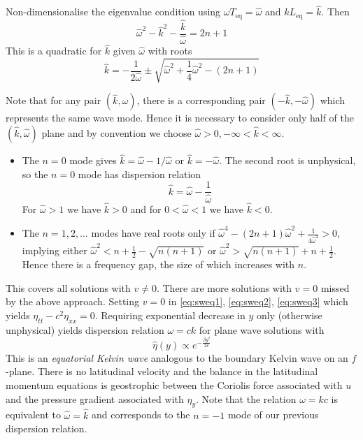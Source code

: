 \documentclass{jknotes}
\begin{document}
Non-dimensionalise the eigenvalue condition using $\omega T_{\text{eq}} =
\hat{\omega}$ and $k L_{\text{eq}} = \hat{k}$. Then
\begin{equation}
	\hat{\omega}^2 - \hat{k}^2 - \frac{\hat{k}}{\hat{\omega}} = 2n+1
\end{equation}
This is a quadratic for $\hat{k}$ given $\hat{\omega}$ with roots
\begin{equation}
	\hat{k} = -\frac{1}{2\hat{\omega}} \pm \sqrt{\hat{\omega}^2 +
	\frac{1}{4}\hat{\omega}^2 - (2n+1)}
\end{equation}

Note that for any pair $(\hat{k}, \hat{\omega})$, there is a corresponding
pair $(-\hat{k},-\hat{\omega})$ which represents the same wave mode. Hence it
is necessary to consider only half of the $(\hat{k}, \hat{\omega})$ plane and
by convention we choose $\hat{\omega} > 0, -\infty < \hat{k} < \infty$. 

\begin{itemize}
	\item The $n=0$ mode gives $\hat{k} = \hat{\omega} - 1/\hat{\omega}$ or
		$\hat{k} = -\hat{\omega}$. The second root is unphysical, so the $n=0$
		mode has dispersion relation
		\begin{equation}
			\hat{k} = \hat{\omega} - \frac{1}{\hat{\omega}}
		\end{equation}
		For $\hat{\omega} > 1$ we have $\hat{k} > 0$ and for $0 < \hat{\omega}
		< 1$ we have $\hat{k} < 0$.
	\item The $n = 1, 2, \dots$ modes have real roots only if $\hat{\omega}^4
		- (2n+1)\hat{\omega}^2 + \frac{1}{4\hat{\omega}^2} > 0$, implying
		either $\hat{\omega}^2 < n+\frac{1}{2}-\sqrt{n(n+1)}$ or
		$\hat{\omega}^2 > \sqrt{n(n+1)} + n + \frac{1}{2}$. Hence there is a
		frequency gap, the size of which increases with $n$.
\end{itemize}

This covers all solutions with $v \ne 0$. There are more solutions with $v =
0$ missed by the above approach. Setting $v=0$ in
\eqref{eq:sweq1}, \eqref{eq:sweq2}, \eqref{eq:sweq3} which yields $\eta_{tt} -
c^2 \eta_{xx} = 0$. Requiring exponential decrease in $y$ only (otherwise
unphysical) yields dispersion relation $\omega = ck$ for plane wave solutions
with
\begin{equation}
	\hat{\eta}(y) \propto e^{-\frac{\beta y^2}{2c}}
\end{equation}
This is an \emph{equatorial Kelvin wave} analogous to the boundary Kelvin wave
on an $f$-plane. There is no latitudinal velocity and the balance in the
latitudinal momentum equations is geostrophic between the Coriolis force
associated with $u$ and the pressure gradient associated with $\eta_y$. Note
that the relation $\omega = kc$ is equivalent to $\hat{\omega} = \hat{k}$ and
corresponds to the $n=-1$ mode of our previous dispersion relation.
\end{document}
